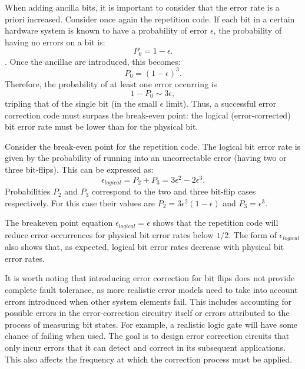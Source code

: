 When adding ancilla bits, it is important to consider that the error rate is a priori increased. Consider once again the repetition code. If each bit in a certain hardware system is known to have a probability of error $\epsilon$, the probability of having no errors on a bit is: \begin{equation}
    P_0=1-\epsilon.
\end{equation}.
Once the ancillae are introduced, this becomes:
\begin{equation}
    P_0=(1-\epsilon)^3.
\end{equation} 
Therefore, the probability of at least one error occurring is 
\begin{equation}
    1-P_0 \sim 3\epsilon,
\end{equation} 
tripling that of the single bit (in the small $\epsilon$ limit). Thus, a successful error correction code must surpass the break-even point: the logical (error-corrected) bit error rate must be lower than for the physical bit. 

Consider the break-even point for the repetition code. The logical bit error rate is given by the probability of running into an uncorrectable error (having two or three bit-flips). This can be expressed as:
\begin{equation}
    \epsilon_{logical} = P_2 + P_3 = 3\epsilon^2 - 2\epsilon^3.
\end{equation}
Probabilities $P_2$ and $P_3$ correspond to the two and three bit-flip cases respectively. For this case their values are $P_2 = 3\epsilon^2(1-\epsilon)$ and $P_3 = \epsilon^3$.

The breakeven point equation $\epsilon_{logical}=\epsilon$ shows that the repetition code will reduce error occurrences for physical bit error rates below $1/2$. The form of $\epsilon_{logical}$ also shows that, as expected, logical bit error rates decrease with physical bit error rates.

It is worth noting that introducing error correction for bit flips does not provide complete fault tolerance, as more realistic error models need to take into account errors introduced when other system elements fail. This includes accounting for possible errors in the error-correction circuitry itself or errors attributed to the process of measuring bit states. For example, a realistic logic gate will have some chance of failing when used. The goal is to design error correction circuits that only incur errors that it can detect and correct in its subsequent applications.
This also affects the frequency at which the correction process must be applied.

